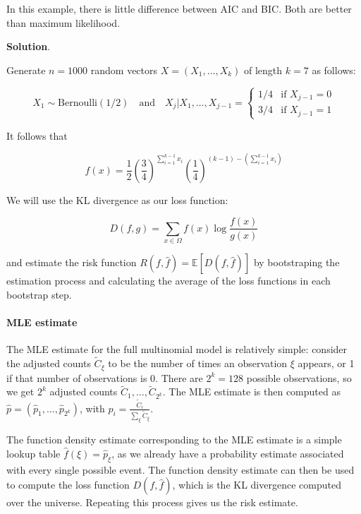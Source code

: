 In this example, there is little difference between AIC and BIC. Both
are better than maximum likelihood.

\textbf{Solution}.

Generate \(n = 1000\) random vectors \(X = (X_{1}, \dots, X_{k})\) of
length \(k = 7\) as follows:

\[ X_{1} \sim \text{Bernoulli}(1/2) 
\quad \text{and} \quad
X_{j} | X_{1}, \dots, X_{j-1} = \begin{cases}
1/4 & \text{if } X_{j-1} = 0 \\
3/4 & \text{if } X_{j-1} = 1
\end{cases}
\]

It follows that

\[ f(x) = \frac{1}{2} \left( \frac{3}{4} \right)^{\sum_{i=1}^{k - 1} x_{i}} \left( \frac{1}{4} \right)^{(k - 1) - \left(\sum_{i=1}^{k - 1} x_{i} \right)} \]

We will use the KL divergence as our loss function:

\[ D(f, g) = \sum_{x \in \Omega} f(x) \log \frac{f(x)}{g(x)} \]

and estimate the risk function
\(R(f, \hat{f}) = \mathbb{E}[D(f, \hat{f})]\) by bootstraping the
estimation process and calculating the average of the loss functions in
each bootstrap step.

\paragraph{MLE estimate}\label{mle-estimate}

The MLE estimate for the full multinomial model is relatively simple:
consider the adjusted counts \(\tilde{C}_{\xi}\) to be the number of
times an observation \(\xi\) appears, or 1 if that number of
observations is 0. There are \(2^{k} = 128\) possible observations, so we
get \(2^{k}\) adjusted counts \(\tilde{C}_{1}, \dots, \tilde{C}_{2^{k}}\). The
MLE estimate is then computed as
\(\hat{p} = (\hat{p}_{1}, \dots, \hat{p}_{2^{k}})\), with
\(\hat{p}_{i} = \frac{\tilde{C}_{i}}{\sum_\xi \tilde{C}_\xi}\).

The function density estimate corresponding to the MLE estimate is a
simple lookup table \(\hat{f}(\xi) = \hat{p}_\xi\), as we already have a
probability estimate associated with every single possible event. The
function density estimate can then be used to compute the loss function
\(D(f, \hat{f})\), which is the KL divergence computed over the
universe. Repeating this process gives us the risk estimate.


